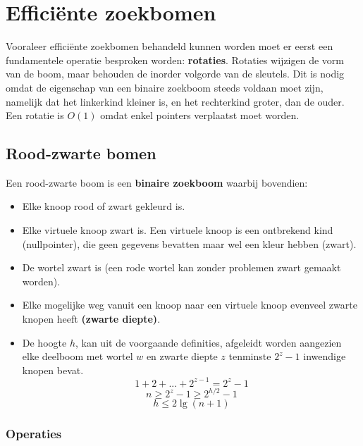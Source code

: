 \documentclass{report}
\begin{document}
	\tableofcontents
	\chapter{Efficiënte zoekbomen}
	Vooraleer efficiënte zoekbomen behandeld kunnen worden moet er eerst een fundamentele operatie besproken worden: \textbf{rotaties}. Rotaties wijzigen de vorm van de boom, maar behouden de inorder volgorde van de sleutels. Dit is nodig omdat de eigenschap van een binaire zoekboom steeds voldaan moet zijn, namelijk dat het linkerkind kleiner is, en het rechterkind groter, dan de ouder. Een rotatie is $O(1)$ omdat enkel pointers verplaatst moet worden. 
	\section{Rood-zwarte bomen}
	Een rood-zwarte boom is een \textbf{binaire zoekboom} waarbij bovendien:
	\begin{itemize}
		\item Elke knoop rood of zwart gekleurd is.
		\item Elke virtuele knoop zwart is. Een virtuele knoop is een ontbrekend kind (nullpointer), die geen gegevens bevatten maar wel een kleur hebben (zwart).
		\item De wortel zwart is (een rode wortel kan zonder problemen zwart gemaakt worden).
		\item Elke mogelijke weg vanuit een knoop naar een virtuele knoop evenveel zwarte knopen heeft \textbf{(zwarte diepte)}.
		\item De hoogte $h$, kan uit de voorgaande definities, afgeleidt worden aangezien elke deelboom met wortel $w$ en zwarte diepte $z$ tenminste $2^z - 1$ inwendige knopen bevat. 
		$$1 + 2 + ... + 2^{z - 1} = 2^z - 1$$ 
		$$n \geq 2^z - 1 \geq 2^{h/2} - 1$$
		$$h \leq 2\lg(n + 1)$$
	\end{itemize}
	\subsection{Operaties}
\end{document}
